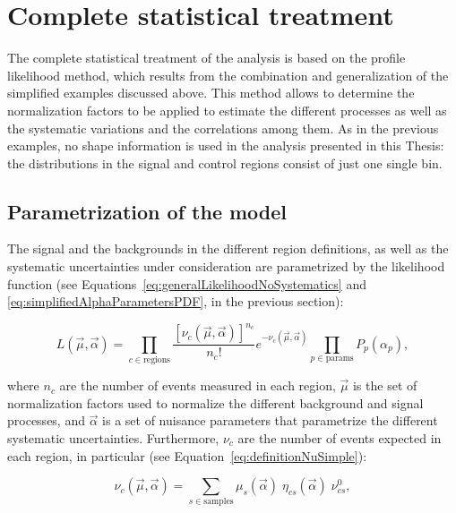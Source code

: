 \section{Complete statistical treatment}
    \label{sec:StatisticalTreatment}

The complete statistical treatment of the analysis is based on the profile likelihood method, which results from the combination and generalization of the simplified examples discussed above.
This method allows to determine the normalization factors to be applied to estimate the different processes as well as the systematic variations and the correlations among them.
As in the previous examples, no shape information is used in the analysis presented in this Thesis: the distributions in the signal and control regions consist of just one single bin.

\subsection{Parametrization of the model}
    \label{subsec:ParametrizationModel}

The signal and the backgrounds in the different region definitions, as well as the systematic uncertainties under consideration are parametrized by the likelihood function (see Equations~\ref{eq:generalLikelihoodNoSystematics} and \ref{eq:simplifiedAlphaParametersPDF}, in the previous section):

\begin{equation}
L(\vec{\mu}, \vec{\alpha}) = 
 \prod_{c \in \text{regions}}{\frac{[\nu_c(\vec{\mu}, \vec{\alpha})]^{n_c}}{n_c!}e^{-\nu_c(\vec{\mu}, \vec{\alpha})}}
 \prod_{p\in\text{params}}{P_p(\alpha_p)},
\label{eq:PdfFit}
\end{equation}

\noindent where $n_c$ are the number of events measured in each region, $\vec{\mu}$ is the set of normalization factors used to normalize the different background and signal processes, and $\vec{\alpha}$ is a set of nuisance parameters that parametrize the different systematic uncertainties.
Furthermore, $\nu_c$ are the number of events expected in each region, in particular (see Equation~\ref{eq:definitionNuSimple}):

\begin{equation}
\nu_c(\vec{\mu}, \vec{\alpha}) = \sum_{s\in\text{samples}}{\mu_s(\vec{\alpha})\;\eta_{cs}(\vec{\alpha})\;\nu^0_{cs}},
\label{eq:nuInPdfFit}
\end{equation}

